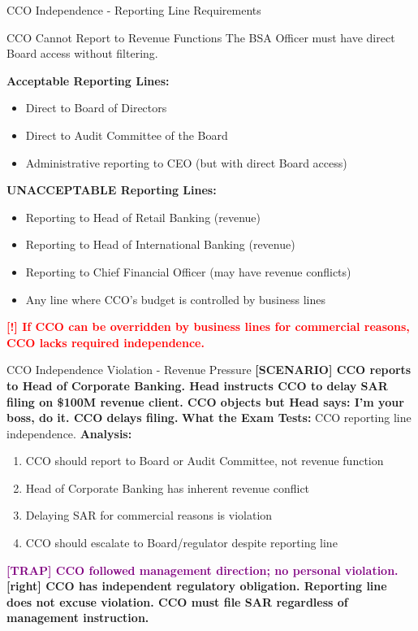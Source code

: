\documentclass[11pt,a4paper]{beamer}
\newcommand{\redflag}[1]{\textcolor{red}{\textbf{[!] #1}}}
\newcommand{\trap}[1]{\textcolor{purple}{\textbf{[TRAP] #1}}}
\newcommand{\correct}[1]{\textcolor{green!50!black}{\textbf{[right] #1}}}
\newcommand{\scenario}[1]{\textcolor{blue!70!black}{\textbf{[SCENARIO] #1}}}
\begin{document}

\begin{frame}{CCO Independence - Reporting Line Requirements}
\begin{block}{CCO Cannot Report to Revenue Functions}
The BSA Officer must have direct Board access without filtering.
\end{block}
\textbf{Acceptable Reporting Lines:}
\begin{itemize}
\item Direct to Board of Directors
\item Direct to Audit Committee of the Board
\item Administrative reporting to CEO (but with direct Board access)
\end{itemize}
\textbf{UNACCEPTABLE Reporting Lines:}
\begin{itemize}
\item Reporting to Head of Retail Banking (revenue)
\item Reporting to Head of International Banking (revenue)
\item Reporting to Chief Financial Officer (may have revenue conflicts)
\item Any line where CCO's budget is controlled by business lines
\end{itemize}
\redflag{If CCO can be overridden by business lines for commercial reasons, CCO lacks required independence.}
\end{frame}

\begin{frame}{CCO Independence Violation - Revenue Pressure}
\scenario{CCO reports to Head of Corporate Banking. Head instructs CCO to delay SAR filing on \$100M revenue client. CCO objects but Head says: I'm your boss, do it. CCO delays filing.}
\vspace{0.2cm}
\textbf{What the Exam Tests:} CCO reporting line independence.
\vspace{0.2cm}
\textbf{Analysis:}
\begin{enumerate}
\item CCO should report to Board or Audit Committee, not revenue function
\item Head of Corporate Banking has inherent revenue conflict
\item Delaying SAR for commercial reasons is violation
\item CCO should escalate to Board/regulator despite reporting line
\end{enumerate}
\trap{CCO followed management direction; no personal violation.}
\correct{CCO has independent regulatory obligation. Reporting line does not excuse violation. CCO must file SAR regardless of management instruction.}
\end{frame}
\end{document}
